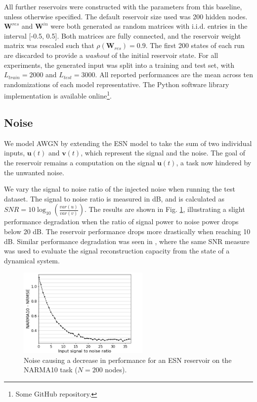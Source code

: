 All further reservoirs were constructed with the parameters from this baseline,
unless otherwise specified. The default reservoir size used was 200 hidden
nodes. $\mathbf{W}^{res}$ and $\mathbf{W}^{in}$ were both generated as random
matrices with i.i.d. entries in the interval [-0.5, 0.5]. Both matrices are
fully connected, and the reservoir weight matrix was rescaled such that
$\rho(\mathbf{W}_{res}) = 0.9$. The first 200 states of each run are discarded
to provide a \textit{washout} of the initial reservoir state. For all
experiments, the generated input was split into a training and test set, with
$L_{train} = 2000$ and $L_{test} = 3000$. All reported performances are the mean
across ten randomizations of each model representative. The Python software
library implementation is available online\footnote{Some GitHub repository.}.

\subsection{Noise}

We model AWGN by extending the ESN model to take the sum of two individual
inputs, $\mathbf{u}(t)$ and $\mathbf{v}(t)$, which represent the signal and the
noise. The goal of the reservoir remains a computation on the signal
$\mathbf{u}(t)$, a task now hindered by the unwanted noise.

We vary the signal to noise ratio of the injected noise when running the test
dataset. The signal to noise ratio is measured in dB, and is calculated as $SNR
= 10\log_{10}(\frac{var(u)}{var(v)})$. The results are shown in
Fig. \ref{input_noise_snr}, illustrating a slight performance degradation when
the ratio of signal power to noise power drops below 20 dB. The reservoir
performance drops more drastically when reaching 10 dB. Similar performance
degradation was seen in \cite{dambre_information_2012}, where the same SNR
measure was used to evaluate the signal reconstruction capacity from the state
of a dynamical system.

\begin{figure}
  \centering
  \includegraphics[width=2.5in]{img/input_noise_snr.png}
  \caption{
    Noise causing a decrease in performance for an ESN reservoir on the NARMA10
task ($N = 200$ nodes).
  }
  \label{input_noise_snr}
\end{figure}

